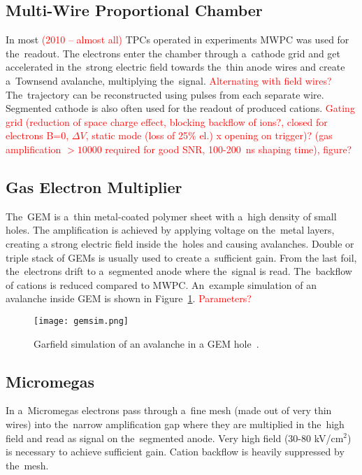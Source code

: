 		\subsection{Multi-Wire Proportional Chamber}
			In most \textcolor{red}{(2010 -- almost all)} \ac{TPC}s operated in experiments \acf{MWPC} was used for the~readout. The electrons enter the chamber through a~cathode grid and get accelerated in the~strong electric field towards the~thin anode wires and create a~Townsend avalanche, multiplying the~signal. \textcolor{red}{Alternating with field wires?} The~trajectory can be reconstructed using pulses from each separate wire. Segmented cathode is also often used for the readout of produced cations. \textcolor{red}{Gating grid (reduction of space charge effect, blocking backflow of ions?, closed for electrons B=0, $\Delta V$, static mode (loss of 25\% el.) x opening on trigger)? (gas amplification $>10000$ required for good SNR, 100-200~ns shaping time), figure?}
			
		\subsection{Gas Electron Multiplier}
			The~\acf{GEM} is a~thin metal\nobreakdash-coated polymer sheet with a~high density of small holes. The amplification is achieved by applying voltage on the~metal layers, creating a strong electric field inside the~holes and causing avalanches. Double or triple stack of \ac{GEM}s is usually used to create a~sufficient gain. From the last foil, the~electrons drift to a~segmented anode where the~signal is read. The~backflow of cations is reduced compared to \ac{MWPC}. An~example simulation of an avalanche inside \ac{GEM} is shown in Figure~\ref{fig:gemsim}. \textcolor{red}{Parameters?}
			
			\begin{figure}
				\centering
				\texttt{[image: gemsim.png]}
				\caption{Garfield simulation of an avalanche in a \ac{GEM} hole~\cite{gemsim}.}
				\label{fig:gemsim}
			\end{figure}
		
		\subsection{Micromegas}
			In a~\ac{Micromegas} electrons pass through a~fine mesh (made out of very thin wires) into the~narrow amplification gap where they are multiplied in the~high field and read as signal on the~segmented anode. Very high field (30-80 kV/cm$^2$) is necessary to achieve sufficient gain. Cation backflow is heavily suppressed by the~mesh.
			
